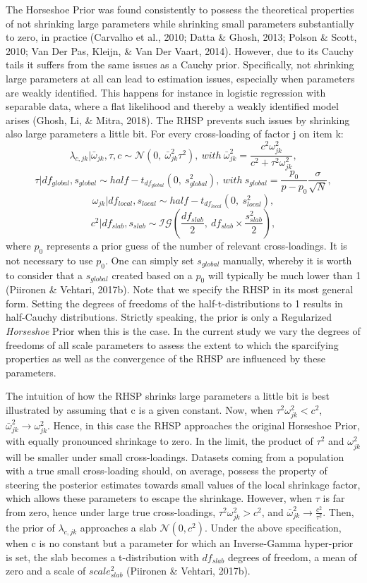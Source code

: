 \documentclass[
  man, donotrepeattitle,floatsintext]{apa6}
\begin{document}
The Horseshoe Prior was found consistently to possess the theoretical properties of not shrinking large parameters while shrinking small parameters substantially to zero, in practice (Carvalho et al., 2010; Datta \& Ghosh, 2013; Polson \& Scott, 2010; Van Der Pas, Kleijn, \& Van Der Vaart, 2014). However, due to its Cauchy tails it suffers from the same issues as a Cauchy prior. Specifically, not shrinking large parameters at all can lead to estimation issues, especially when parameters are weakly identified. This happens for instance in logistic regression with separable data, where a flat likelihood and thereby a weakly identified model arises (Ghosh, Li, \& Mitra, 2018). The RHSP prevents such issues by shrinking also large parameters a little bit. For every cross-loading of factor j on item k:
\[\lambda_{c,jk} | \bar{\omega}_{jk}, \tau, c\sim \mathcal{N}(0, \ \bar{\omega}^2_{jk} \tau^2), \ with \ \bar{\omega}^2_{jk} = \frac{c^2\omega_{jk}^2}{c^2 + \tau^2 \omega_{jk}^2},\]
\[\tau | df_{global}, s_{global} \sim half-t_{df_{global}}(0,\  s_{global}^2), \ with \  s_{global} = \frac{p_0}{p-p_0}\frac{\sigma}{\sqrt{N}},\]
\[\omega_{jk}| df_{local}, s_{local} \sim half-t_{df_{local}}(0, \ s_{local}^2),\]
\[c^2 | df_{slab}, s_{slab} \sim \mathcal{IG}(\frac{df_{slab}}{2}, \  df_{slab} \times \frac{s_{slab}^2}{2}),\]
where \(p_0\) represents a prior guess of the number of relevant cross-loadings. It is not necessary to use \(p_0\). One can simply set \(s_{global}\) manually, whereby it is worth to consider that a \(s_{global}\) created based on a \(p_0\) will typically be much lower than 1 (Piironen \& Vehtari, 2017b). Note that we specify the RHSP in its most general form. Setting the degrees of freedoms of the half-t-distributions to 1 results in half-Cauchy distributions. Strictly speaking, the prior is only a Regularized \emph{Horseshoe} Prior when this is the case. In the current study we vary the degrees of freedoms of all scale parameters to assess the extent to which the sparcifying properties as well as the convergence of the RHSP are influenced by these parameters.

The intuition of how the RHSP shrinks large parameters a little bit is best illustrated by assuming that c is a given constant. Now, when \(\tau^2 \omega^2_{jk} < c^2\), \(\bar{\omega}^2_{jk} \to \omega^2_{jk}\). Hence, in this case the RHSP approaches the original Horseshoe Prior, with equally pronounced shrinkage to zero. In the limit, the product of \(\tau^2\) and \(\omega^2_{jk}\) will be smaller under small cross-loadings. Datasets coming from a population with a true small cross-loading should, on average, possess the property of steering the posterior estimates towards small values of the local shrinkage factor, which allows these parameters to escape the shrinkage. However, when \(\tau\) is far from zero, hence under large true cross-loadings, \(\tau^2 \omega^2_{jk} > c^2\), and \(\bar{\omega}^2_{jk} \to \frac{c^2}{\tau^2}\). Then, the prior of \(\lambda_{c,jk}\) approaches a slab \(\mathcal{N}(0, c^2)\). Under the above specification, when c is no constant but a parameter for which an Inverse-Gamma hyper-prior is set, the slab becomes a t-distribution with \(df_{slab}\) degrees of freedom, a mean of zero and a scale of \(scale_{slab}^2\) (Piironen \& Vehtari, 2017b).
\end{document}
